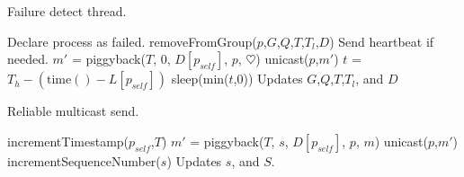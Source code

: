 \documentclass[]{article}
\begin{document}
\begin{algorithm}
\caption{Failure detect thread.}
\label{alg:failure}
\begin{algorithmic}[1]
\State
\Repeat
			\Comment Declare process as failed.
			\State removeFromGroup($p$,$G$,$Q$,$T$,$T_l$,$D$)
			\Comment Send heartbeat if needed.
			\State $m'$ = piggyback($T$, 0, $D[p_{self}]$, $p$, $\heartsuit$)
			\State unicast($p$,$m'$)
		\EndIf
	\EndFor
	\State $t$ = $T_h - (\text{time}() - L[p_{self}])$
	\State sleep(min($t$,0))
\EndProcedure
 \Comment Updates $G$,$Q$,$T$,$T_l$, and $D$
\end{algorithmic}
\end{algorithm}



\begin{algorithm}
\caption{Reliable multicast send.}
\label{alg:send}
\begin{algorithmic}[1]

	\State incrementTimestamp($p_{self}$,$T$)
	\State $m'$ = piggyback($T$, $s$, $D[p_{self}]$, $p$, $m$)
	\State unicast($p$,$m'$)
\EndFor
\State incrementSequenceNumber($s$)
\EndProcedure
\Comment Updates $s$, and $S$.
\end{algorithmic}
\end{algorithm}
\end{document}
